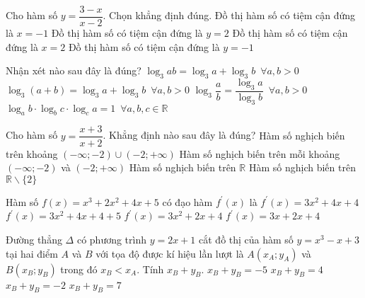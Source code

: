 \begin{ex}%
Cho hàm số $y=\dfrac{3-x}{x-2}$. Chọn khẳng định đúng.
\choice
{Đồ thị hàm số có tiệm cận đứng là $x=-1$}
{Đồ thị hàm số có tiệm cận đứng là $y=2$}
{\True Đồ thị hàm số có tiệm cận đứng là $x=2$}
{Đồ thị hàm số có tiệm cận đứng là $y=-1$}
\end{ex}

\begin{ex}%
Nhận xét nào sau đây là đúng?
\choice
{\True $\log_3{ab}=\log_3{a}+\log_3{b} \, \,\, \forall a,b >0$}
{$\log_3{(a+b)}=\log_3{a}+\log_3{b} \, \,\, \forall a,b >0$}
{$\log_3{\dfrac{a}{b}}=\dfrac{\log_3a}{\log_3b}\,\,\, \forall a,b >0$}
{$\log_ab \cdot \log_bc \cdot \log_ca=1 \,\,\, \forall a,b,c\in \mathbb{R}$}
{}
\end{ex}

\begin{ex}%
Cho hàm số $y=\dfrac{x+3}{x+2}$. Khẳng định nào sau đây là đúng?
\choice
{Hàm số nghịch biến trên khoảng $(-\infty;-2)\cup (-2;+\infty)$}
{\True Hàm số nghịch biến trên mỗi khoảng $(-\infty;-2)$ và $(-2;+\infty)$}
{Hàm số nghịch biến trên $\mathbb{R}$}
{Hàm số nghịch biến trên $\mathbb{R}\backslash \{2\}$}
\end{ex}

\begin{ex}%
Hàm số $f(x)=x^3+2x^2+4x+5$ có đạo hàm $f^\prime (x)$ là
\choice
{\True $f^\prime (x) = 3x^2+4x+4$}
{$f^\prime (x) = 3x^2+4x+4+5$}
{$f^\prime (x) = 3x^2+2x+4$}
{$f^\prime (x) = 3x+2x+4$}
\end{ex}

\begin{ex}%
Đường thẳng $\Delta$ có phương trình $y=2x+1$ cắt đồ thị của hàm số $y=x^3-x+3$ tại hai điểm $A$ và $B$ với tọa độ được kí hiệu lần lượt là $A(x_A;y_A)$ và $B(x_B;y_B)$ trong đó $x_B <x_A$. Tính $x_B + y_B$.
\choice
{\True $x_B + y_B=-5$}
{$x_B + y_B=4$}
{$x_B + y_B=-2$}
{$x_B + y_B=7$}
\end{ex}

